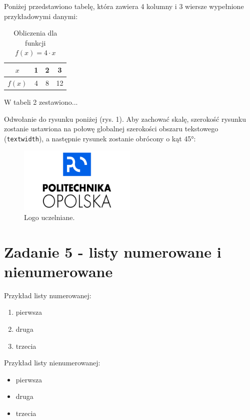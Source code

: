 \documentclass[b5paper,11pt]{article}
\begin{document}
\begin{spacing}{1.5}
    Poniżej przedstawiono tabelę, która zawiera 4 kolumny i 3 wiersze wypełnione przykładowymi danymi:

    \begin{table}[h]
        \centering
        \caption{Obliczenia dla funkcji $f(x) = 4 \cdot x$}
        \begin{tabular}{|c|c|c|c|}
            \hline
            $x$    & 1 & 2 & 3  \\
            \hline
            $f(x)$ & 4 & 8 & 12 \\
            \hline
        \end{tabular}
    \end{table}

    W tabeli 2 zestawiono...

    Odwołanie do rysunku poniżej (rys. 1). Aby zachować skalę, szerokość rysunku zostanie ustawiona na połowę globalnej szerokości obszaru tekstowego (\texttt{textwidth}), a następnie rysunek zostanie obrócony o kąt 45°:

    \begin{figure}[h]
        \centering
        \includegraphics[width=0.5\textwidth, angle=45]{images/logotyp-politechnika-opolska-01.jpg} %
        \caption{Logo uczelniane.}
    \end{figure}

    \newpage
    \section{Zadanie 5 - listy numerowane i nienumerowane}

    Przykład listy numerowanej:
    \begin{enumerate}
        \item pierwsza
        \item druga
        \item trzecia
    \end{enumerate}

    Przykład listy nienumerowanej:
    \begin{itemize}
        \item pierwsza
        \item druga
        \item trzecia
    \end{itemize}


\end{spacing}
\end{document}
